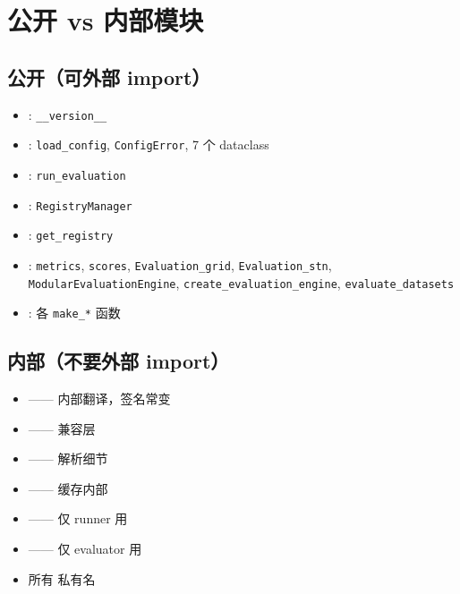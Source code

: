 \section{公开 vs 内部模块}

\subsection{公开（可外部 import）}

\begin{itemize}
  \item {}: \texttt{\_\_version\_\_}
  \item {}: \texttt{load\_config}, \texttt{ConfigError}, 7 个 dataclass
  \item {}: \texttt{run\_evaluation}
  \item {}: \texttt{RegistryManager}
  \item {}: \texttt{get\_registry}
  \item {}: \texttt{metrics}, \texttt{scores}, \texttt{Evaluation\_grid}, \texttt{Evaluation\_stn}, \texttt{ModularEvaluationEngine}, \texttt{create\_evaluation\_engine}, \texttt{evaluate\_datasets}
  \item {}: 各 \texttt{make\_*} 函数
\end{itemize}

\subsection{内部（不要外部 import）}

\begin{itemize}
  \item {} —— 内部翻译，签名常变
  \item {} —— 兼容层
  \item {} —— 解析细节
  \item {} —— 缓存内部
  \item {} —— 仅 runner 用
  \item {} —— 仅 evaluator 用
  \item 所有 \modname{\_*} 私有名
\end{itemize}

